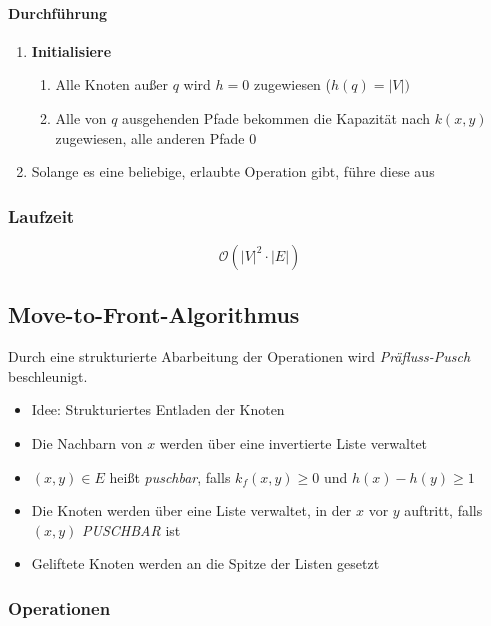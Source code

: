 \paragraph{Durchführung}
\begin{enumerate}
	\item \textbf{Initialisiere}
	\begin{enumerate}
		\item Alle Knoten außer \(q\) wird \(h=0\) zugewiesen (\(h(q) = |V|)\)
		\item Alle von \(q\) ausgehenden Pfade bekommen die Kapazität nach \(k(x,y)\) zugewiesen, alle anderen Pfade \(0\)
	\end{enumerate}
	\item Solange es eine beliebige, erlaubte Operation gibt, führe diese aus
\end{enumerate}


\subsubsection{Laufzeit}
\[\mathcal{O} (|V|^2 \cdot |E|)\]


\subsection{Move-to-Front-Algorithmus}
Durch eine strukturierte Abarbeitung der Operationen wird \textit{Präfluss-Pusch} beschleunigt.

\begin{itemize}
	\item Idee: Strukturiertes Entladen der Knoten
	\item Die Nachbarn von \(x\) werden über eine invertierte Liste verwaltet
	\item \((x,y) \in E\) heißt \textit{puschbar}, falls \(k_f(x,y) \geq 0\) und \(h(x)-h(y)\geq 1\)
	\item Die Knoten werden über eine Liste verwaltet, in der \(x\) vor \(y\) auftritt, falls \((x,y)\) \textit{PUSCHBAR} ist
	\item Geliftete Knoten werden an die Spitze der Listen gesetzt
\end{itemize}

\subsubsection{Operationen}

\text{}\\


